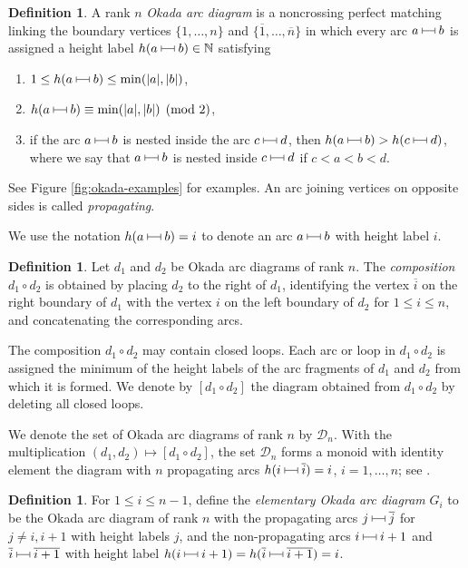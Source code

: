 \documentclass[12pt,reqno]{amsart}
\numberwithin{equation}{section}
\theoremstyle{definition}
\newtheorem{definition}[theorem]{Definition}
\theoremstyle{definition}
\newcommand{\arcjoin}{\mathrel{%
  \rule[0.1ex]{0.4pt}{1.1ex}%
  \rule[0.6ex]{1em}{0.4pt}%
  \rule[0.1ex]{0.4pt}{1.1ex}%
}}
\begin{document}
\begin{definition}
A rank $n$ \emph{Okada arc diagram} is a noncrossing perfect matching linking
the boundary vertices $\{1,\ldots,n\}$ and $\{\overline1,\ldots,\overline n\}$ in which
every arc $a\arcjoin b$ is assigned a height label
$h(a\arcjoin b)\in\mathbb{N}$ satisfying
\begin{enumerate}
\item $1\le h(a\arcjoin b)\le\min(|a|,|b|)$,
\item $h(a\arcjoin b)\equiv\min(|a|,|b|)\pmod 2$,
\item if the arc $a\arcjoin b$ is nested inside the arc $c\arcjoin d$, then
$h(a\arcjoin b)>h(c\arcjoin d)$, where we say that $a\arcjoin b$ is nested
inside $c\arcjoin d$ if $c<a<b<d$.
\end{enumerate}
See Figure \ref{fig:okada-examples} for examples.
An arc joining vertices on opposite sides is called \emph{propagating}.
\end{definition}
We use the notation $h(a\arcjoin b)=i$ to denote an arc $a\arcjoin b$ with height label $i$. 
\begin{definition}
Let $d_1$ and $d_2$ be Okada arc diagrams of rank $n$. The \emph{composition}
$d_1\circ d_2$ is obtained by placing $d_2$ to the right of $d_1$, identifying
the vertex $\overline i$ on the right boundary of $d_1$ with the vertex $i$ on the
left boundary of $d_2$ for $1\le i\le n$, and concatenating the corresponding
arcs.


The composition $d_1\circ d_2$ may contain closed loops. Each arc or loop in
$d_1\circ d_2$ is assigned the minimum of the height labels of the arc
fragments of $d_1$ and $d_2$ from which it is formed. We denote by
$[d_1\circ d_2]$ the diagram obtained from $d_1\circ d_2$ by deleting all
closed loops.
\end{definition}


We denote the set of Okada arc diagrams of rank $n$ by $\mathcal D_n$. With the
multiplication $(d_1,d_2)\mapsto[d_1\circ d_2]$, the set $\mathcal D_n$ forms a
monoid with identity element the diagram with $n$ propagating arcs
$h(i\arcjoin\overline i)=i$, $i=1,\ldots,n$; see
\cite[Theorem 3.43]{HivertScott}.


\begin{definition}
For $1\le i\le n-1$, define the \emph{elementary Okada arc diagram} $G_i$ to be
the Okada arc diagram of rank $n$ with the propagating arcs $j\arcjoin\overline j$
for $j\ne i,i+1$ with height labels $j$, and the non-propagating arcs
$i\arcjoin i+1$ and $\overline i\arcjoin\overline{i+1}$ with height label
$h(i\arcjoin i+1)=h(\overline i\arcjoin\overline{i+1})=i$.
\end{definition}
\end{document}
